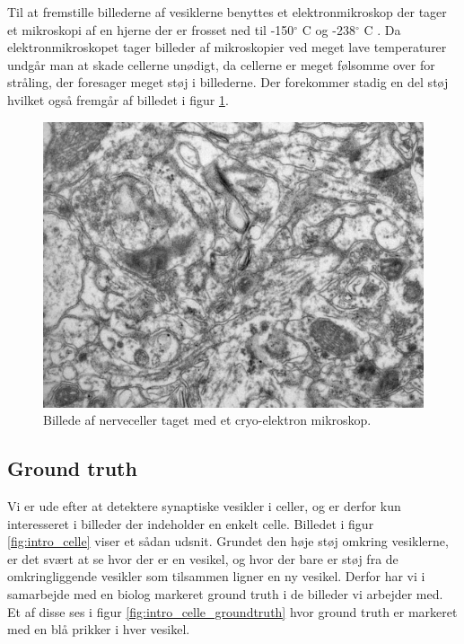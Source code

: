 Til at fremstille billederne af vesiklerne benyttes et elektronmikroskop der tager et mikroskopi af en hjerne der er frosset ned til -150$^\circ$ C og -238$^\circ$ C .
Da elektronmikroskopet tager billeder af mikroskopier ved meget lave temperaturer undgår man at skade cellerne unødigt, da cellerne er meget følsomme over for stråling, der foresager meget støj i billederne. Der forekommer stadig en del støj hvilket også fremgår af billedet i figur \ref{fig:intro_celler}.

\begin{figure}[H]
	\centering
	\includegraphics[scale=0.5]{files/intro/img/celler.jpg}
	\caption{Billede af nerveceller taget med et cryo-elektron mikroskop.\label{fig:intro_celler}}
\end{figure}

\subsection{Ground truth}				
Vi er ude efter at detektere synaptiske vesikler i celler, og er derfor kun interesseret i billeder der indeholder en enkelt celle. Billedet i figur \ref{fig:intro_celle} viser et sådan udsnit. Grundet den høje støj omkring vesiklerne, er det svært at se hvor der er en vesikel, og hvor der bare er støj fra de omkringliggende vesikler som tilsammen ligner en ny vesikel. Derfor har vi i samarbejde med en biolog markeret ground truth i de billeder vi arbejder med. Et af disse ses i figur \ref{fig:intro_celle_groundtruth} hvor ground truth er markeret med en blå prikker i hver vesikel.

